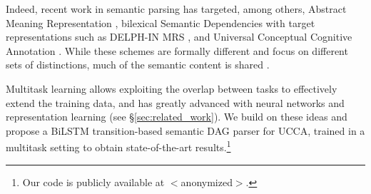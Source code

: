 \documentclass[11pt,a4paper]{article}
\begin{document}
Indeed, recent work in semantic parsing has targeted, among others,
Abstract Meaning Representation \cite[AMR;][]{banarescu2013abstract,damonte-17,Buys2017RobustIN},
bilexical Semantic Dependencies \cite[SDP;][]{oepen2014semeval,oepen2015semeval,oepen2016towards,P17-1186}
with target representations such as DELPH-IN MRS \cite[DM;][]{flickinger2012deepbank},
and Universal Conceptual Cognitive Annotation \cite[UCCA;][]{abend2013universal,hershcovich2017a}.
While these schemes are formally different and focus on different sets of distinctions,
much of the semantic content is shared \cite{abend2017state}.


Multitask learning \cite{caruana1998multitask} allows exploiting the overlap between tasks
to effectively extend the training data,
and has greatly advanced with neural networks and representation learning
(see \S\ref{sec:related_work}).
We build on these ideas and propose a BiLSTM transition-based semantic DAG parser for UCCA,
trained in a multitask setting to obtain state-of-the-art 
results.\footnote{Our code is publicly available at $<$anonymized$>$.}
\end{document}
